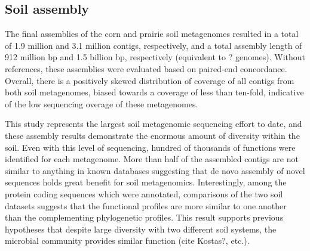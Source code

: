 \documentclass[11pt]{article} %
\begin{document}
\subsection{Soil assembly}
The final assemblies of the corn and prairie soil metagenomes resulted in a total of 1.9 million and 3.1 million contigs, respectively, and a total assembly length of 912 million bp and 1.5 billion bp, respectively (equivalent to ? genomes).  Without references, these assemblies were evaluated based on paired-end concordance.  Overall, there is a positively skewed distribution of coverage of all contigs from both soil metagenomes, biased towards a coverage of less than ten-fold, indicative of the low sequencing overage of these metagenomes.  


This study represents the largest soil metagenomic sequencing effort to date, and these assembly results demonstrate the enormous amount of diversity within the soil.  Even with this level of sequencing, hundred of thousands of functions were identified for each metagenome.  More than half of the assembled contigs are not similar to anything in known databases suggesting that de novo assembly of novel sequences holds great benefit for soil metagenomics.  Interestingly, among the protein coding sequences which were annotated, comparisons of the two soil datasets suggests that the functional profiles are more similar to one another than the complementing phylogenetic profiles.  This result supports previous hypotheses that despite large diversity with two different soil systems, the microbial community provides similar function (cite Kostas?, etc.).  
\end{document}
